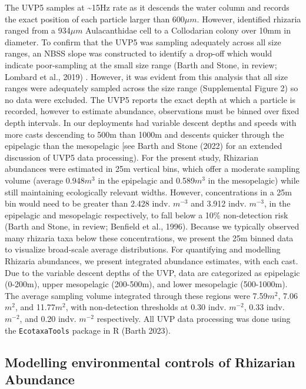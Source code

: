 \documentclass[
]{article}
\begin{document}
The UVP5 samples at \textasciitilde15Hz rate as it descends the water
column and records the exact position of each particle larger than
600\(\mu m\). However, identified rhizaria ranged from a 934\(\mu m\)
Aulacanthidae cell to a Collodarian colony over 10mm in diameter. To
confirm that the UVP5 was sampling adequately across all size ranges, an
NBSS slope was constructed to identify a drop-off which would indicate
poor-sampling at the small size range (Barth and Stone, in review;
Lombard et al., 2019) . However, it was evident from this analysis that
all size ranges were adequately sampled across the size range
(Supplemental Figure 2) so no data were excluded. The UVP5 reports the
exact depth at which a particle is recorded, however to estimate
abundance, observations must be binned over fixed depth intervals. In
our deployments had variable descent depths and speeds with more casts
descending to 500m than 1000m and descents quicker through the
epipelagic than the mesopelagic {[}see Barth and Stone (2022) for an
extended discussion of UVP5 data processing). For the present study,
Rhizarian abundances were estimated in 25m vertical bins, which offer a
moderate sampling volume (average 0.948\(m^3\) in the epipelagic and
0.589\(m^3\) in the mesopelagic) while still maintaining ecologically
relevant widths. However, concentrations in a 25m bin would need to be
greater than 2.428 indv. \(m^{-3}\) and 3.912 indv. \(m^{-3}\), in the
epipelagic and mesopelagic respectively, to fall below a 10\%
non-detection risk (Barth and Stone, in review; Benfield et al., 1996).
Because we typically observed many rhizaria taxa below these
concentrations, we present the 25m binned data to visualize broad-scale
average distributions. For quantifying and modelling Rhizaria
abundances, we present integrated abundance estimates, with each cast.
Due to the variable descent depths of the UVP, data are categorized as
epipelagic (0-200m), upper mesopelagic (200-500m), and lower mesopelagic
(500-1000m). The average sampling volume integrated through these
regions were 7.59\(m^2\), 7.06\(m^2\), and 11.77\(m^2\), with
non-detection thresholds at 0.30 indv. \(m^{-2}\), 0.33 indv.
\(m^{-2}\), and 0.20 indv. \(m^{-2}\) respectively. All UVP data
processing was done using the \texttt{EcotaxaTools} package in R (Barth
2023).

\hypertarget{modelling-environmental-controls-of-rhizarian-abundance}{%
\subsection{Modelling environmental controls of Rhizarian
Abundance}\label{modelling-environmental-controls-of-rhizarian-abundance}}
\end{document}
